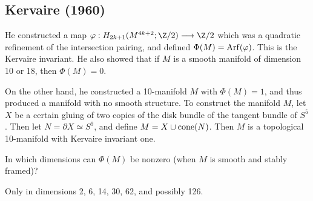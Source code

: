 \documentclass[11pt]{article}
\begin{document}
\subsection*{Kervaire (1960)}He constructed a map
$\phi:H_{2k+1}(M^{4k+2};\Z/2)\to\Z/2$ which was a quadratic refinement of the
intersection pairing, and defined $\Phi(M)=\operatorname{Arf}(\varphi)$. This is the
Kervaire invariant. He also showed that if $M$ is a smooth manifold of dimension
10 or 18, then $\Phi(M)=0$.

On the other hand, he constructed a 10-manifold $M$ with $\Phi(M)=1$, and thus
produced a manifold with no smooth structure. To construct the manifold $M$, let
$X$ be a certain gluing of two copies of the disk bundle of the tangent bundle
of $S^5$. Then let $N=\partial X\simeq S^9$, and define $M=X\cup\operatorname{cone}(N)$. Then
$M$ is a topological 10-manifold with Kervaire invariant one.
\begin{question}
In which dimensions can $\Phi(M)$ be nonzero (when $M$ is smooth and stably
framed)?
\end{question}
\begin{answer}
Only in dimensions 2, 6, 14, 30, 62, and possibly 126. 
\end{answer}
\end{document}
